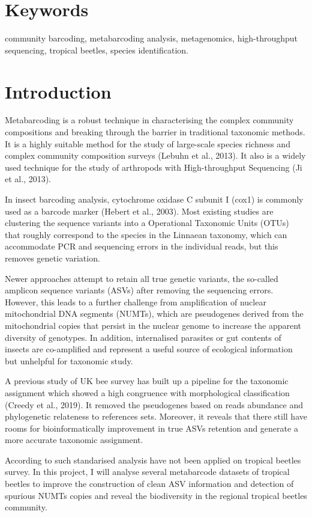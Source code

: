 \documentclass[11pt, a4paper]{article}
\begin{document}
\linenumbers
\section*{Keywords}
community barcoding,   metabarcoding analysis,   metagenomics,   high-throughput sequencing,   tropical beetles,   species identification.

\section*{Introduction}
Metabarcoding is a robust technique in characterising the complex community compositions and breaking through the barrier in traditional taxonomic methods. It is a highly suitable method for the study of large-scale species richness and complex community composition surveys (Lebuhn et al., 2013). It also is a widely used technique for the study of arthropods with High-throughput Sequencing (Ji et al., 2013). 

In insect barcoding analysis, cytochrome oxidase C subunit I (cox1) is commonly used as a barcode marker (Hebert et al., 2003).  Most existing studies are clustering the sequence variants into a Operational Taxonomic Units (OTUs) that roughly correspond to the species in the Linnaean taxonomy, which can accommodate PCR and sequencing errors in the individual reads, but this removes genetic variation. 

Newer approaches attempt to retain all true genetic variants, the so-called amplicon sequence variants (ASVs) after removing the sequencing errors. However, this leads to a further challenge from amplification of nuclear mitochondrial DNA segments (NUMTs), which are pseudogenes derived from the mitochondrial copies that persist in the nuclear genome to increase the apparent diversity of genotypes. In addition, internalised parasites or gut contents of insects are co-amplified and represent a useful source of ecological information but unhelpful for taxonomic study. 

A previous study of UK bee survey has built up a pipeline for the taxonomic assignment which showed a high congruence with morphological classification (Creedy et al., 2019). It removed the pseudogenes based on reads abundance and phylogenetic relateness to references sets. Moreover, it reveals that there still have rooms for bioinformatically improvement in true ASVs retention and generate a more accurate taxonomic assignment. 

According to such standarised analysis have not been applied on tropical beetles survey. In this project, I will analyse several metabarcode datasets of tropical beetles to improve the construction of clean ASV information and detection of spurious NUMTs copies and reveal the biodiversity in the regional tropical beetles community.
\end{document}
